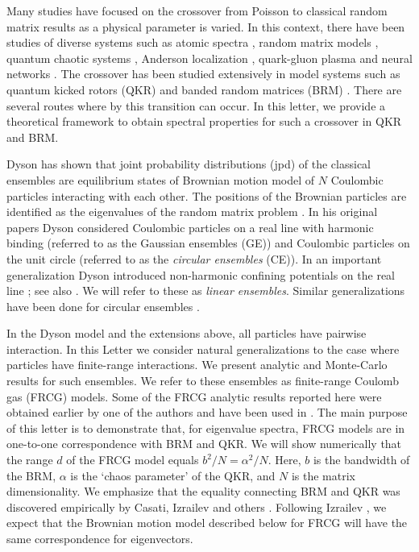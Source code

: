 \documentclass[reprint,amsmath,amssymb,showpacs,aps,]{revtex4-1}
\begin{document}
{Many studies have focused on the crossover from Poisson to classical random matrix results as a physical parameter is varied. In this context, there have been studies of diverse systems such as atomic spectra \cite{RP}, random matrix models \cite{AP2},  quantum chaotic systems \cite{WM,SVZ,BR,FKPT,GH,AP1}, Anderson localization \cite{SM,BKS,MMMS}, quark-gluon plasma \cite{GKP} and neural networks \cite{AHN}. The crossover has been studied  extensively in model systems such as quantum kicked rotors (QKR) and banded random matrices (BRM) \cite{FM1,PF,FM2,CMI,CGIS,WFL,CIM,FYMR,FYMRL,CCGI,CGIlZ,FCIC}. There are several routes where by this transition can occur. In this letter, we provide a theoretical framework to obtain spectral properties for such a crossover in QKR and BRM.\par
Dyson has shown that joint probability distributions (jpd) of the classical ensembles are equilibrium states of Brownian motion model of $N$ Coulombic particles interacting with each other. The positions of the Brownian particles are identified as the eigenvalues of the random matrix problem \cite{FDY}. In his original papers Dyson considered Coulombic particles on a real line with harmonic binding (referred to as the Gaussian ensembles (GE)) and Coulombic particles on the unit circle (referred to as the \textit{circular ensembles} (CE)). In an important generalization Dyson introduced non-harmonic confining potentials on the real line \cite{FDY1}; see also \cite{AP1,GPPS,KP1,PPK}. We will refer to these as \textit{linear ensembles}. Similar generalizations have been done for circular ensembles \cite{KP2}.\par
In the Dyson model and the extensions above, all particles have pairwise interaction. In this Letter we consider natural generalizations to the case where particles have finite-range interactions. We present analytic and Monte-Carlo results for such ensembles. We refer to these ensembles as finite-range Coulomb gas (FRCG) models. Some of the FRCG analytic results reported here were obtained earlier by one of the authors \cite{AP} and have been used in \cite{BGS1,JK,BGS2}. The main purpose of this letter is to demonstrate that, for eigenvalue spectra, FRCG models are in one-to-one correspondence with BRM and QKR. We will show numerically that the range $d$ of the FRCG model equals $b^{2}/N=\alpha^{2}/N$. Here, $b$ is the bandwidth of the BRM, $\alpha$ is the `chaos parameter' of the QKR, and $N$ is the matrix dimensionality. We emphasize that the equality connecting BRM and QKR was discovered empirically by Casati, Izrailev and others \cite{FM2,CMI,CGIS,CIM}. Following Izrailev \cite{FM2}, we expect that the Brownian motion model described below for FRCG will have the same correspondence for eigenvectors. \par
}
\end{document}
